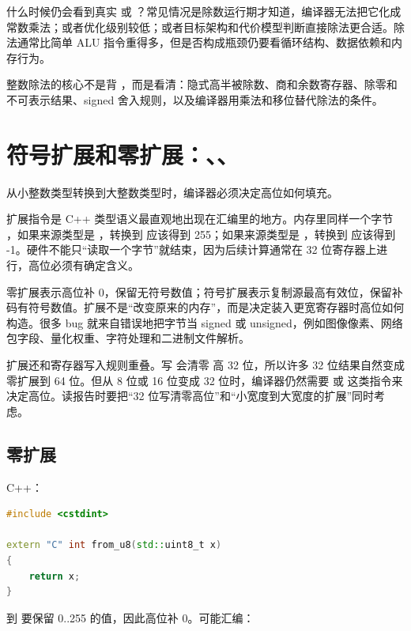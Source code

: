 什么时候仍会看到真实  或 ？常见情况是除数运行期才知道，编译器无法把它化成常数乘法；或者优化级别较低；或者目标架构和代价模型判断直接除法更合适。除法通常比简单 ALU 指令重得多，但是否构成瓶颈仍要看循环结构、数据依赖和内存行为。

\begin{keyidea}
整数除法的核心不是背 ，而是看清：隐式高半被除数、商和余数寄存器、除零和不可表示结果、signed 舍入规则，以及编译器用乘法和移位替代除法的条件。
\end{keyidea}

\section{符号扩展和零扩展：、、}

从小整数类型转换到大整数类型时，编译器必须决定高位如何填充。

扩展指令是 C++ 类型语义最直观地出现在汇编里的地方。内存里同样一个字节 ，如果来源类型是 ，转换到  应该得到 255；如果来源类型是 ，转换到  应该得到 -1。硬件不能只“读取一个字节”就结束，因为后续计算通常在 32 位寄存器上进行，高位必须有确定含义。

零扩展表示高位补 0，保留无符号数值；符号扩展表示复制源最高有效位，保留补码有符号数值。扩展不是“改变原来的内存”，而是决定装入更宽寄存器时高位如何构造。很多 bug 就来自错误地把字节当 signed 或 unsigned，例如图像像素、网络包字段、量化权重、字符处理和二进制文件解析。

扩展还和寄存器写入规则重叠。写  会清零  高 32 位，所以许多 32 位结果自然变成零扩展到 64 位。但从 8 位或 16 位变成 32 位时，编译器仍然需要  或  这类指令来决定高位。读报告时要把“32 位写清零高位”和“小宽度到大宽度的扩展”同时考虑。

\subsection{零扩展}

C++：

\begin{lstlisting}[language=C++]
#include <cstdint>

extern "C" int from_u8(std::uint8_t x)
{
    return x;
}
\end{lstlisting}

 到  要保留 0..255 的值，因此高位补 0。可能汇编：


